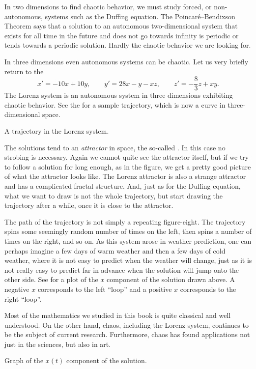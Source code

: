 \documentclass{ximera}
\begin{document}
In two dimensions to find chaotic behavior, we must study forced, or non-autonomous, systems such as the Duffing equation. The Poincar\'e--Bendixson Theorem says that a solution to an autonomous two-dimensional system that exists for all time in the future and does not go towards infinity is periodic or tends towards a periodic solution.  Hardly the chaotic behavior we are looking for.

In three dimensions even autonomous systems can be chaotic. Let us very briefly return to the 
\begin{equation*}
    x' = -10x +10y, \qquad y' = 28x-y-xz, \qquad z'=-\frac{8}{3}z + xy .
\end{equation*}
The Lorenz system is an autonomous system in three dimensions exhibiting chaotic behavior. See the  for a sample trajectory, which is now a curve in three-dimensional space.
\begin{myfig}
    \capstart
    \caption{A trajectory in the Lorenz system. \label{nlin:lorenz}}
\end{myfig}

The solutions tend to an \emph{attractor} in space, the so-called \emph{}. In this case no strobing is necessary. Again we cannot quite see the attractor itself, but if we try to follow a solution for long enough, as in the figure, we get a pretty good picture of what the attractor looks like. The Lorenz attractor is also a strange attractor and has a complicated fractal structure.  And, just as for the Duffing equation, what we want to draw is not the whole trajectory, but start drawing the trajectory after a while, once it is close to the attractor.

The path of the trajectory is not simply a repeating figure-eight. The trajectory spins some seemingly random number of times on the left, then spins a number of times on the right, and so on.  As this system arose in weather prediction, one can perhaps imagine a few days of warm weather and then a few days of cold weather, where it is not easy to predict when the weather will change, just as it is not really easy to predict far in advance when the solution will jump onto the other side.  See  for a plot of the $x$ component of the solution drawn above.  A negative $x$ corresponds to the left ``loop'' and a positive $x$ corresponds to the right ``loop''.

Most of the mathematics we studied in this book is quite classical and well understood. On the other hand, chaos, including the Lorenz system, continues to be the subject of current research. Furthermore, chaos has found applications not just in the sciences, but also in art.

\begin{myfig}
    \capstart
    \caption{Graph of the $x(t)$ component of the solution.
    \label{nlin:lorenz-graphx}}
\end{myfig}
\end{document}
